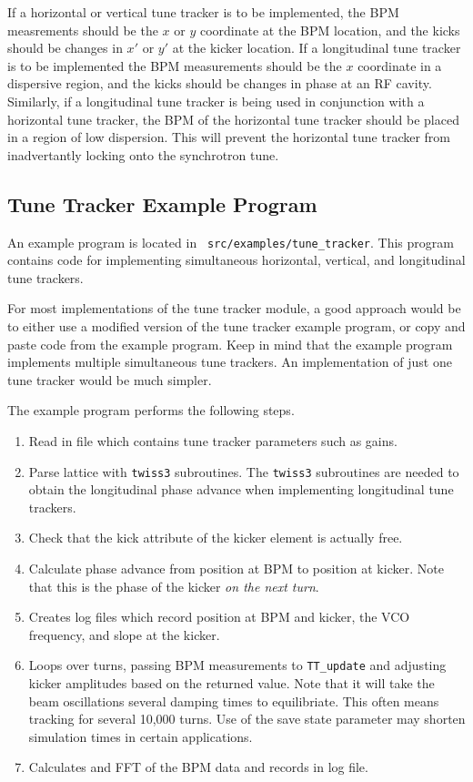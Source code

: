 If a horizontal or vertical tune tracker is to be implemented, the BPM
measrements should be the $x$ or $y$ coordinate at the BPM location,
and the kicks should be changes in $x'$ or $y'$ at the kicker
location.  If a longitudinal tune tracker is to be implemented the BPM
measurements should be the $x$ coordinate in a dispersive region, and
the kicks should be changes in phase at an RF cavity.  Similarly, if a
longitudinal tune tracker is being used in conjunction with a
horizontal tune tracker, the BPM of the horizontal tune tracker should
be placed in a region of low dispersion.  This will prevent the
horizontal tune tracker from inadvertantly locking onto the
synchrotron tune.

\subsection{Tune Tracker Example Program}

An example program is located in {\tt
src/examples/tune\_tracker}. This program contains code for
implementing simultaneous horizontal, vertical, and longitudinal tune
trackers.

For most implementations of the tune tracker module, a good approach
would be to either use a modified version of the tune tracker example
program, or copy and paste code from the example program.  Keep in
mind that the example program implements multiple simultaneous tune
trackers.  An implementation of just one tune tracker would be much
simpler.

The example program performs the following steps.
\begin{enumerate}
\item 
Read in file which contains tune tracker parameters such as gains.
\item 
Parse lattice with {\tt twiss3} subroutines.  The {\tt twiss3} subroutines
are needed to obtain the longitudinal phase advance when implementing 
longitudinal tune trackers.
\item 
Check that the kick attribute of the kicker element is actually free.
\item 
Calculate phase advance from position at BPM to position at kicker.  Note that this 
is the phase of the kicker {\it on the next turn}.
\item 
Creates log files which record position at BPM and kicker, the VCO frequency,
and slope at the kicker.
\item
Loops over turns, passing BPM measurements to {\tt TT\_update} and
adjusting kicker amplitudes based on the returned value.  Note that it
will take the beam oscillations several damping times to equilibriate.
This often means tracking for several 10,000 turns.  Use of the save
state parameter may shorten simulation times in certain applications.
\item 
Calculates and FFT of the BPM data and records in log file. 
\end{enumerate}

